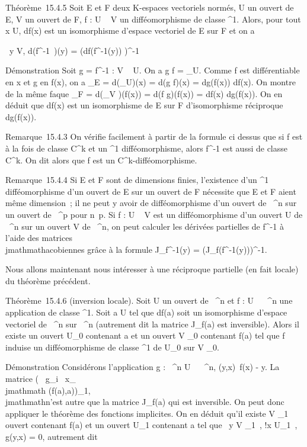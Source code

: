 \documentclass[]{article}
\begin{document}
Théorème~15.4.5 Soit E et F deux K-espaces vectoriels normés, U un
ouvert de E, V un ouvert de F, f : U \rightarrow~ V un difféomorphisme de classe
^1. Alors, pour tout x \in U, df(x) est un isomorphisme
d'espace vectoriel de E sur F et on a

\forall~y \in V, d(f^-1~)(y) =
\left (df(f^-1(y))\right
)^-1

Démonstration Soit g = f^-1 : V \rightarrow~ U. On a g \cdot f =
\mathrmId_U. Comme f est différentiable en x
et g en f(x), on a \mathrmId_E =
d(\mathrmId_U)(x) = d(g \cdot f)(x) = dg(f(x)) \cdot
df(x). On montre de la même fa\ccon que
\mathrmId_F =
d(\mathrmId_V )(f(x)) = d(f \cdot g)(f(x)) =
df(x) \cdot dg(f(x)). On en déduit que df(x) est un isomorphisme de E sur F
d'isomorphisme réciproque dg(f(x)).

Remarque~15.4.3 On vérifie facilement à partir de la formule ci dessus
que si f est à la fois de classe C^k et un ^1
difféomorphisme, alors f^-1 est aussi de classe
C^k. On dit alors que f est un
C^k-difféomorphisme.

Remarque~15.4.4 Si E et F sont de dimensions finies, l'existence d'un
^1 difféomorphisme d'un ouvert de E sur un ouvert de F
nécessite que E et F aient même dimension~; il ne peut y avoir de
difféomorphisme d'un ouvert de ~^n sur un ouvert de
~^p pour n\neq~p. Si f : U \rightarrow~ V est un
difféomorphisme d'un ouvert U de ~^n sur un ouvert V de
~^n, on peut calculer les dérivées partielles de
f^-1 à l'aide des matrices \\jmathmathacobiennes grâce à la formule
J_f^-1(y) = \left
(J_f(f^-1(y))\right )^-1.

Nous allons maintenant nous intéresser à une réciproque partielle (en
fait locale) du théorème précédent.

Théorème~15.4.6 (inversion locale). Soit U un ouvert de ~^n
et f : U \rightarrow~ ~^n une application de classe ^1. Soit
a \in U tel que df(a) soit un isomorphisme d'espace vectoriel de
~^n sur ~^n (autrement dit la matrice
J_f(a) est inversible). Alors il existe un ouvert U_0
contenant a et un ouvert V _0 contenant f(a) tel que f induise
un difféomorphisme de classe ^1 de U_0 sur V
_0.

Démonstration Considérons l'application g : ~^n \times U \rightarrow~
~^n, (y,x)\mapsto~f(x) - y. La matrice
\left ( \partial~g_i \over
\partial~x_\\jmathmath (f(a),a)\right )_1\leqi,\\jmathmath\leqn n'est
autre que la matrice J_f(a) qui est inversible. On peut donc
appliquer le théorème des fonctions implicites. On en déduit qu'il
existe V _1 ouvert contenant f(a) et un ouvert U_1
contenant a tel que \forall~y \in V _1~,
\exists!x \in U_1~, g(y,x) = 0, autrement dit
\end{document}
